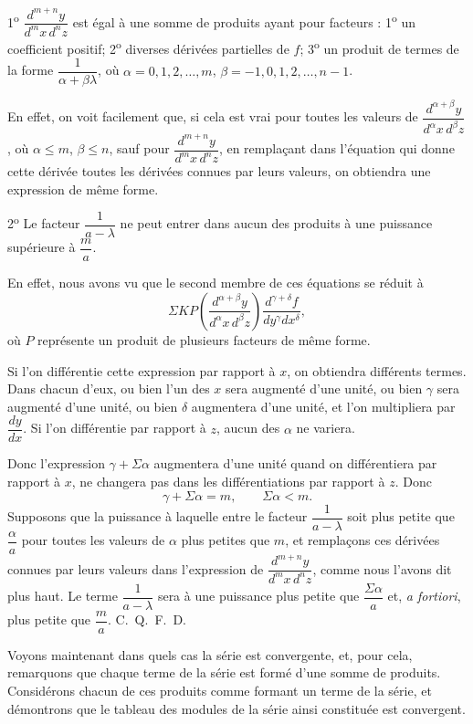 \documentclass[11pt]{article}
\begin{document}
1\textsuperscript{o} $\dfrac{d^{m+n}y}{d^m x\,d^n z}$ est égal à une somme de produits ayant pour facteurs : 1\textsuperscript{o} un coefficient positif; 2\textsuperscript{o} diverses dérivées partielles de $f$; 3\textsuperscript{o} un produit de termes de la forme $\dfrac{1}{\alpha+\beta\lambda}$, où $\alpha=0,1,2,\ldots,m$, $\beta=-1,0,1,2,\ldots,n-1$.

En effet, on voit facilement que, si cela est vrai pour toutes les valeurs de $\dfrac{d^{\alpha+\beta}y}{d^\alpha x\,d^\beta z}$, où $\alpha\le m$, $\beta\le n$, sauf pour $\dfrac{d^{m+n}y}{d^m x\,d^n z}$, en remplaçant dans l’équation qui donne cette dérivée toutes les dérivées connues par leurs valeurs, on obtiendra une expression de même forme.

2\textsuperscript{o} Le facteur $\dfrac{1}{a-\lambda}$ ne peut entrer dans aucun des produits à une puissance supérieure à $\dfrac{m}{a}$.

En effet, nous avons vu que le second membre de ces équations se réduit à
\[
\Sigma KP\left(\frac{d^{\alpha+\beta}y}{d^\alpha x\,d^\beta z}\right)\frac{d^{\gamma+\delta}f}{dy^\gamma dx^\delta},
\]
où $P$ représente un produit de plusieurs facteurs de même forme.

Si l’on différentie cette expression par rapport à $x$, on obtiendra différents termes. Dans chacun d’eux, ou bien l’un des $x$ sera augmenté d’une unité, ou bien $\gamma$ sera augmenté d’une unité, ou bien $\delta$ augmentera d’une unité, et l’on multipliera par $\dfrac{dy}{dx}$. Si l’on différentie par rapport à $z$, aucun des $\alpha$ ne variera.

Donc l’expression $\gamma+\Sigma\alpha$ augmentera d’une unité quand on différentiera par rapport à $x$, ne changera pas dans les différentiations par rapport à $z$. Donc
\[
\gamma+\Sigma\alpha=m,
\qquad
\Sigma\alpha<m.
\]
Supposons que la puissance à laquelle entre le facteur $\dfrac{1}{a-\lambda}$ soit plus petite que $\dfrac{\alpha}{a}$ pour toutes les valeurs de $\alpha$ plus petites que $m$, et remplaçons ces dérivées connues par leurs valeurs dans l’expression de $\dfrac{d^{m+n}y}{d^m x\,d^n z}$, comme nous l’avons dit plus haut. Le terme $\dfrac{1}{a-\lambda}$ sera à une puissance plus petite que $\dfrac{\Sigma\alpha}{a}$ et, \emph{a fortiori}, plus petite que $\dfrac{m}{a}$. \hfill\mbox{C. Q. F. D.}

Voyons maintenant dans quels cas la série est convergente, et, pour cela, remarquons que chaque terme de la série est formé d’une somme de produits. Considérons chacun de ces produits comme formant un terme de la série, et démontrons que le tableau des modules de la série ainsi constituée est convergent.
\end{document}
